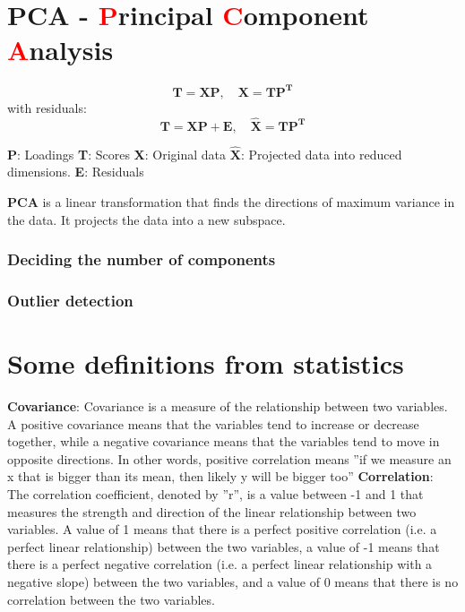 \section{PCA - \textcolor{red}{P}rincipal \textcolor{red}{C}omponent \textcolor{red}{A}nalysis}
\begin{equation}
\mathbf{
    T = XP, \quad X = TP^T
}
\end{equation}
with residuals:
\begin{equation}
\mathbf{
T = XP + E, \quad \hat{X} = TP^T
}
\end{equation}

\textbf{P}: \quad Loadings \newline
\textbf{T}: \quad Scores \newline
\textbf{X}: \quad Original data \newline
\textbf{$\mathbf{\hat{X}}$}: \quad Projected data into reduced dimensions. \newline
\textbf{E}: \quad Residuals \newline

\textbf{PCA} is a linear transformation that finds the directions of maximum variance in the data. It projects the data into a new subspace.
\newline
\newline

\subsubsection{Deciding the number of components}
\subsubsection{Outlier detection}



\section{Some definitions from statistics}

\textbf{Covariance}: Covariance is a measure of the relationship between two
variables. A positive covariance means that the variables tend to increase
or decrease together, while a negative covariance means that the variables
tend to move in opposite directions. In other words, positive correlation
means ”if we measure an x that is bigger than its mean, then likely y will
be bigger too”\newline \newline
\textbf{Correlation}: The correlation coefficient, denoted by ”r”, is a value between
-1 and 1 that measures the strength and direction of the linear relationship
between two variables. A value of 1 means that there is a perfect positive
correlation (i.e. a perfect linear relationship) between the two variables, a
value of -1 means that there is a perfect negative correlation (i.e. a perfect
linear relationship with a negative slope) between the two variables, and a
value of 0 means that there is no correlation between the two variables.

